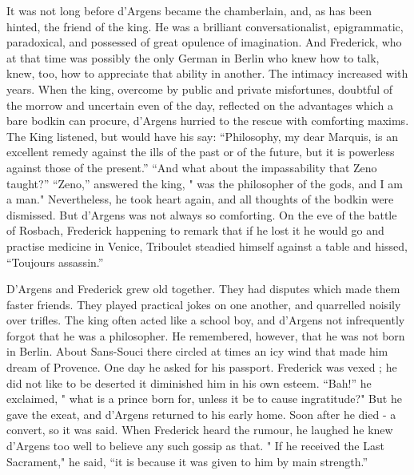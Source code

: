 \documentclass[]{book}
\begin{document}
It was not long before d'Argens became the chamberlain, and, as has been
hinted, the friend of the king. He was a brilliant conversationalist,
epigrammatic, paradoxical, and possessed of great opulence of
imagination. And Frederick, who at that time was possibly the only
German in Berlin who knew how to talk, knew, too, how to appreciate that
ability in another. The intimacy increased with years. When the king,
overcome by public and private misfortunes, doubtful of the morrow and
uncertain even of the day, reflected on the advantages which a bare
bodkin can procure, d'Argens hurried to the rescue with comforting
maxims. The King listened, but would have his say: ``Philosophy, my dear
Marquis, is an excellent remedy against the ills of the past or of the
future, but it is powerless against those of the present.'' ``And what
about the impassability that Zeno taught?'' ``Zeno,'' answered the king,
" was the philosopher of the gods, and I am a man." Nevertheless, he
took heart again, and all thoughts of the bodkin were dismissed. But
d'Argens was not always so comforting. On the eve of the battle of
Rosbach, Frederick happening to remark that if he lost it he would go
and practise medicine in Venice, Triboulet steadied himself against a
table and hissed, ``Toujours assassin.''

D'Argens and Frederick grew old together. They had disputes which made
them faster friends. They played practical jokes on one another, and
quarrelled noisily over trifles. The king often acted like a school boy,
and d'Argens not infrequently forgot that he was a philosopher. He
remembered, however, that he was not born in Berlin. About Sans-Souci
there circled at times an icy wind that made him dream of Provence. One
day he asked for his passport. Frederick was vexed ; he did not like to
be deserted it diminished him in his own esteem. ``Bah!'' he exclaimed,
" what is a prince born for, unless it be to cause ingratitude?" But he
gave the exeat, and d'Argens returned to his early home. Soon after he
died - a convert, so it was said. When Frederick heard the rumour, he
laughed he knew d'Argens too well to believe any such gossip as that. "
If he received the Last Sacrament," he said, ``it is because it was
given to him by main strength.''
\end{document}

